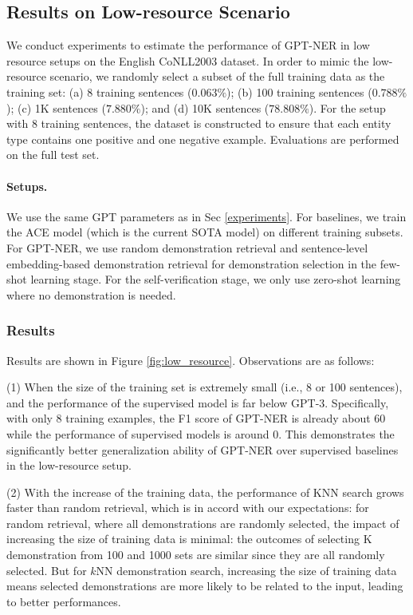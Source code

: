\documentclass{article}
\begin{document}
\subsection{Results on Low-resource Scenario}
We conduct experiments to estimate the performance of 
GPT-NER in low resource setups on the English CoNLL2003 dataset. In order to mimic the low-resource scenario, we  randomly 
select a subset of the full training data as the training set:
(a) 8 training sentences ($0.063\%$); (b) 100 training sentences ($0.788\%$); (c) 1K sentences ($7.880\%$); and (d) 10K sentences ($78.808\%$). 
For the setup with 8 training sentences, 
the dataset is constructed 
to ensure that each entity type contains one positive and one negative example. 
Evaluations are performed on the full test set.

\paragraph{Setups.}
We use the same GPT parameters as in Sec \ref{experiments}. For baselines, we train the  ACE model \cite{wang2020automated}
(which is the current SOTA model)
 on different training subsets. For GPT-NER,  we use random 
 demonstration 
 retrieval and sentence-level embedding-based demonstration retrieval for 
 demonstration selection in the 
 few-shot learning stage. For the self-verification stage, we only use zero-shot learning where no demonstration is needed. 

\subsubsection{Results}
Results are shown in Figure \ref{fig:low_resource}. Observations are as follows:

(1) When 
the size of the training set is extremely small  (i.e., 8 or 100 sentences), and the performance of the supervised model is far below GPT-3. 
Specifically,
with only 8 training examples, the F1 score of GPT-NER is already about 60 while the performance of supervised models is around 0.
This demonstrates the significantly better generalization ability of GPT-NER over supervised baselines in the 
 low-resource setup. 

(2) With the increase of the training data, 
the performance of KNN search grows faster than random retrieval, which is in accord with our expectations: 
for random retrieval, 
where all demonstrations are randomly selected, the impact of increasing the size of training data is minimal:
the outcomes of 
 selecting K demonstration from 100 and 1000 sets are similar since they are all randomly selected.
But for $k$NN demonstration search, increasing the size of training data 
means 
 selected demonstrations are more likely to be related to the input, leading to better performances. 
\end{document}

